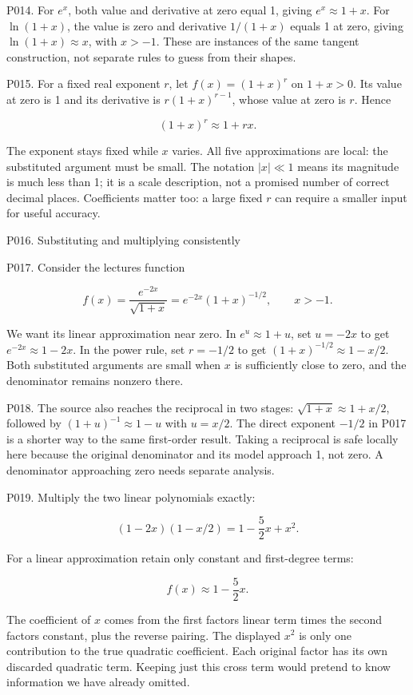 \documentclass[
  11pt,
]{article}
\providecommand{\gt}{>}
\begin{document}
P014. For \(e^x\), both value and derivative at zero equal 1, giving
\(e^x\approx1+x\). For \(\ln(1+x)\), the value is zero and derivative
\(1/(1+x)\) equals 1 at zero, giving \(\ln(1+x)\approx x\), with
\(x\gt -1\). These are instances of the same tangent construction, not
separate rules to guess from their shapes.

P015. For a fixed real exponent \(r\), let \(f(x)=(1+x)^r\) on
\(1+x\gt 0\). Its value at zero is 1 and its derivative is
\(r(1+x)^{r-1}\), whose value at zero is \(r\). Hence

\[
(1+x)^r\approx1+rx.
\]

The exponent stays fixed while \(x\) varies. All five approximations are
local: the substituted argument must be small. The notation \(|x|\ll1\)
means its magnitude is much less than 1; it is a scale description, not
a promised number of correct decimal places. Coefficients matter too: a
large fixed \(r\) can require a smaller input for useful accuracy.

P016. Substituting and multiplying consistently

P017. Consider the lecture\textquotesingle s function

\[
f(x)=\frac{e^{-2x}}{\sqrt{1+x}}=e^{-2x}(1+x)^{-1/2},\qquad x>-1.
\]

We want its linear approximation near zero. In \(e^u\approx1+u\), set
\(u=-2x\) to get \(e^{-2x}\approx1-2x\). In the power rule, set
\(r=-1/2\) to get \((1+x)^{-1/2}\approx1-x/2\). Both substituted
arguments are small when \(x\) is sufficiently close to zero, and the
denominator remains nonzero there.

P018. The source also reaches the reciprocal in two stages:
\(\sqrt{1+x}\approx1+x/2\), followed by \((1+u)^{-1}\approx1-u\) with
\(u=x/2\). The direct exponent \(-1/2\) in P017 is a shorter way to the
same first-order result. Taking a reciprocal is safe locally here
because the original denominator and its model approach 1, not zero. A
denominator approaching zero needs separate analysis.

P019. Multiply the two linear polynomials exactly:

\[
(1-2x)(1-x/2)=1-\frac52x+x^2.
\]

For a linear approximation retain only constant and first-degree terms:

\[
f(x)\approx1-\frac52x.
\]

The coefficient of \(x\) comes from the first factor\textquotesingle s
linear term times the second factor\textquotesingle s constant, plus the
reverse pairing. The displayed \(x^2\) is only one contribution to the
true quadratic coefficient. Each original factor has its own discarded
quadratic term. Keeping just this cross term would pretend to know
information we have already omitted.
\end{document}
